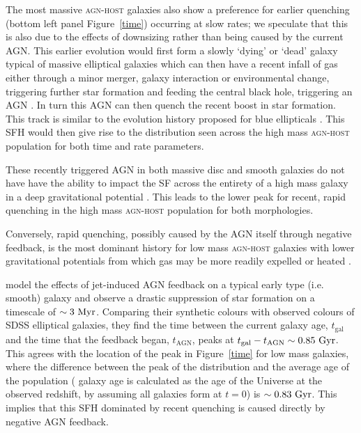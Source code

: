 \documentclass[useAMS,usenatbib]{mn2e}
\def\changed    {\color{nc} }
\def\secondchange    {\color{srv} }
\begin{document}
The most massive \textsc{agn-host} galaxies also show a preference for earlier quenching (bottom left panel Figure~\ref{time}) occurring at slow rates; we speculate that this is also due to the effects of downsizing rather than being caused by the current AGN. This earlier evolution would first form a slowly `dying' or `dead' galaxy typical of massive elliptical galaxies which can then have a recent infall of gas either through a minor merger, galaxy interaction or environmental change, triggering further star formation and feeding the central black hole, triggering an AGN \citep{Kav14}. In turn this AGN can then quench the recent boost in star formation. This track is similar to the evolution history proposed for blue ellipticals \citep{Kav13, McIntosh14, Haines15}. This SFH would then give rise to the distribution seen across the high mass \textsc{agn-host} population for both time and rate parameters.


These recently triggered AGN in both massive disc and smooth galaxies do not have have the ability to impact the SF across the entirety of a high mass galaxy in a deep gravitational potential \citep{Ish12, Zinn13}. This leads to the lower peak for recent, rapid quenching in the high mass \textsc{agn-host} population for both morphologies. 

Conversely, rapid quenching, possibly caused by the AGN itself through negative feedback, is the most dominant history for low mass \textsc{agn-host} galaxies with lower gravitational potentials from which gas may be more readily expelled or heated \citep{Torbra09}. 

\cite{Torbra09} model the effects of jet-induced AGN feedback on a typical early type (i.e. smooth) galaxy {\changed and observe a drastic suppression of star formation on a timescale of $\sim 3 ~\rm{Myr}$. Comparing their synthetic colours with observed colours of SDSS elliptical galaxies, they} find the time between the current galaxy age, $t_\mathrm{gal}$ and the time that the feedback began, $t_\mathrm{AGN}$, peaks at $t_\mathrm{gal} - t_\mathrm{AGN} \sim 0.85 ~\rm{Gyr}$. This agrees with the location of the peak in Figure~\ref{time} for low mass galaxies, where the difference between the peak of the {\secondchange distribution} and the average age of the population ({\secondchange galaxy age is calculated as the age of the Universe at the observed redshift}, by assuming all galaxies form at $t=0$) is $\sim0.83 ~\rm{Gyr}$. This implies that this SFH dominated by recent quenching is caused directly by negative AGN feedback.
\end{document}

